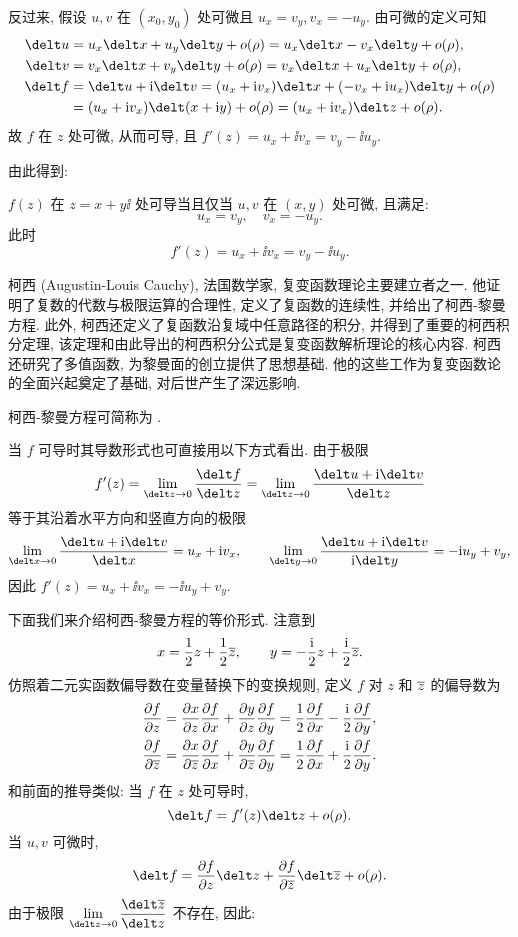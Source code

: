 反过来, 假设 $u,v$ 在 $(x_0,y_0)$ 处可微且 $u_x=v_y, v_x=-u_y$.
由可微的定义可知
\begin{align*}
  \delt u&=u_x\delt x+u_y\delt y+o(\rho)
    =u_x\delt x-v_x\delt y+o(\rho),\\
  \delt v&=v_x\delt x+v_y\delt y+o(\rho)
    =v_x\delt x+u_x\delt y+o(\rho),\\
  \delt f&=\delt u+\ii\delt v
    =(u_x+\ii v_x)\delt x+(-v_x+\ii u_x)\delt y+o(\rho)\\
   &=(u_x+\ii v_x)\delt (x+\ii y)+o(\rho)
    =(u_x+\ii v_x)\delt z+o(\rho).
\end{align*}
故 $f$ 在 $z$ 处可微, 从而可导, 且 $f'(z)=u_x+\ii v_x=v_y-\ii u_y$.

由此得到:

\begin{theorem}[柯西-黎曼定理]
  \label{thm:Cauchy-Riemann}
  $f(z)$ 在 $z=x+y\ii$ 处可导当且仅当 $u,v$ 在 $(x,y)$ 处可微, 且满足:
  \[
    u_x=v_y,\quad v_x=-u_y.
  \]
  此时
  \[
    f'(z)=u_x+\ii v_x=v_y-\ii u_y.
  \]
\end{theorem}

\begin{people}
  柯西 (Augustin-Louis Cauchy), 法国数学家, 复变函数理论主要建立者之一. 他证明了复数的代数与极限运算的合理性, 定义了复函数的连续性, 并给出了柯西-黎曼方程. 此外, 柯西还定义了复函数沿复域中任意路径的积分, 并得到了重要的柯西积分定理, 该定理和由此导出的柯西积分公式是复变函数解析理论的核心内容. 柯西还研究了多值函数, 为黎曼面的创立提供了思想基础. 他的这些工作为复变函数论的全面兴起奠定了基础, 对后世产生了深远影响.
\end{people}

柯西-黎曼方程可简称为 .

当 $f$ 可导时其导数形式也可直接用以下方式看出.
由于极限
\[
   f'(z)
  =\liml_{\delt z\ra 0}\frac{\delt f}{\delt z}
  =\liml_{\delt z\ra 0}\frac{\delt u+\ii\delt v}{\delt z}
\]
等于其沿着水平方向和竖直方向的极限
\[
  \liml_{\delt x\ra 0}\frac{\delt u+\ii\delt v}{\delt x}=u_x+\ii v_x,\qquad
  \liml_{\delt y\ra 0}\frac{\delt u+\ii\delt v}{\ii\delt y}=-\ii u_y+v_y,
\]
因此 $f'(z)=u_x+\ii v_x=-\ii u_y+v_y$.

下面我们来介绍柯西-黎曼方程的等价形式.
注意到
\[
  x=\frac12z+\frac12\overline z,\qquad
  y=-\frac {\mathrm{i}}2z+\frac {\mathrm{i}}2\overline z.
\]
仿照着二元实函数偏导数在变量替换下的变换规则, 定义 $f$ 对 $z$ 和 $\overline z$ 的偏导数为
\begin{align*}
   \pdv fz&
  =\pdv xz\pdv fx+\pdv yz\pdv fy
  =\frac12\pdv fx-\frac {\mathrm{i}}2\pdv fy,\\
   \pdv f{\overline z}&
  =\pdv x{\overline z}\pdv fx+\pdv y{\overline z}\pdv fy
  =\frac12\pdv fx+\frac {\mathrm{i}}2\pdv fy.
\end{align*}
和前面的推导类似: 当 $f$ 在 $z$ 处可导时,
\[
  \delt f=f'(z)\delt z+o(\rho).
\]
当 $u,v$ 可微时,
\[
  \delt f=\pdv fz\delt z+\pdv f{\ov z}\delt \ov z+o(\rho).
\]
由于极限 $\liml_{\delt z\ra 0}\dfrac{\delt \ov z}{\delt z}$ 不存在, 因此:

